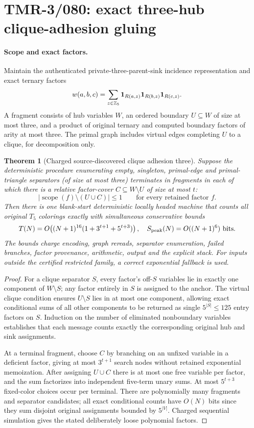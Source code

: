 \documentclass[11pt]{article}
\newtheorem{theorem}{Theorem}
\begin{document}
\section{TMR-3/080: exact three-hub clique-adhesion gluing}
\paragraph{Scope and exact factors.}
Maintain the authenticated private-three-parent-sink incidence
representation and exact ternary factors
\[
w(a,b,c)=\sum_{z\in\mathbb Z_5}
{\bf1}_{R(a,z)}{\bf1}_{R(b,z)}{\bf1}_{R(c,z)}.
\]
A fragment consists of hub variables $W$, an ordered boundary
$U\subseteq W$ of size at most three, and a product of original
ternary and computed boundary factors of arity at most three.
The primal graph includes virtual edges completing $U$ to a clique,
for decomposition only.

\begin{theorem}[Charged source-discovered clique adhesion three]
Suppose the deterministic procedure enumerating empty, singleton,
primal-edge and primal-triangle separators (of size at most three)
terminates in fragments in each of which there is a relative
factor-cover $C\subseteq W\setminus U$ of size at most $t$:
\[
\bigl|\operatorname{scope}(f)\setminus(U\cup C)\bigr|\le1
\qquad\text{for every retained factor }f.
\]
Then there is one blank-start deterministic locally headed machine
that counts all original $T_5$ colorings exactly with simultaneous
conservative bounds
\[
T(N)=O\!\left((N+1)^{16}
 (1+3^{t+1}+5^{t+3})\right),
\quad
S_{\mathrm{peak}}(N)=O((N+1)^6)\ {\rm bits}.
\]
The bounds charge encoding, graph rereads, separator enumeration,
failed branches, factor provenance, arithmetic, output and the
explicit stack. For inputs outside the certified restricted
family, a correct exponential fallback is used.
\end{theorem}
\begin{proof}
For a clique separator $S$, every factor's off-$S$ variables
lie in exactly one component of $W\setminus S$; any factor
entirely in $S$ is assigned to the anchor. The virtual clique
condition ensures $U\setminus S$ lies in at most one component,
allowing exact conditional sums of all other components to be
returned as single $5^{|S|}\le125$ entry factors on $S$.
Induction on the number of eliminated nonboundary variables
establishes that each message counts exactly the corresponding
original hub and sink assignments.

At a terminal fragment, choose $C$ by branching on an unfixed
variable in a deficient factor, giving at most $3^{t+1}$
search nodes without retained exponential memoization.
After assigning $U\cup C$ there is at most one free variable
per factor, and the sum factorizes into independent five-term
unary sums. At most $5^{t+3}$ fixed-color choices occur per
terminal. There are polynomially many fragments and
separator candidates; all exact conditional counts have
$O(N)$ bits since they sum disjoint original assignments
bounded by $5^{|V|}$. Charged sequential simulation gives
the stated deliberately loose polynomial factors.
\end{proof}
\end{document}

